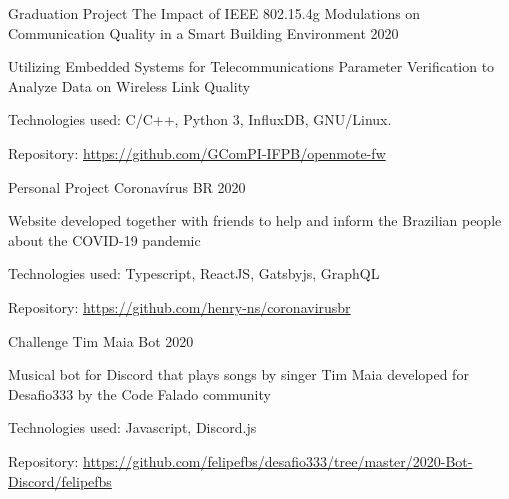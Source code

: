 
\begin{cventries}
  \cventry
  {Graduation Project} %
  {The Impact of IEEE 802.15.4g Modulations on Communication Quality in a Smart Building Environment} %
  {} %
  {2020} %
  {
    \begin{cvitems} %
      \item {Utilizing Embedded Systems for Telecommunications Parameter Verification to Analyze Data on Wireless Link Quality}
      \item {Technologies used: C/C++, Python 3, InfluxDB, GNU/Linux.}
      \item {Repository: \url{https://github.com/GComPI-IFPB/openmote-fw}}
    \end{cvitems}
  }


  \cventry
  {Personal Project} %
  {Coronavírus BR} %
  {} %
  {2020} %
  {
    \begin{cvitems} %
      \item {Website developed together with friends to help and inform the Brazilian people about the COVID-19 pandemic}
      \item {Technologies used: Typescript, ReactJS, Gatsbyjs, GraphQL}
      \item {Repository: \url{https://github.com/henry-ns/coronavirusbr}}
    \end{cvitems}
  }

  \cventry
  {Challenge} %
  {Tim Maia Bot} %
  {} %
  {2020} %
  {
    \begin{cvitems} %
      \item {Musical bot for Discord that plays songs by singer Tim Maia developed for Desafio333 by the Code Falado community}
      \item {Technologies used: Javascript, Discord.js}
      \item {Repository: \url{https://github.com/felipefbs/desafio333/tree/master/2020-Bot-Discord/felipefbs}}
    \end{cvitems}
  }


\end{cventries}
